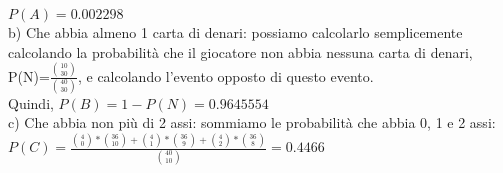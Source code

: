 \documentclass{article}
\begin{document}
\begin{enumerate}
{$P(A)=0.002298$\\
b) Che abbia almeno 1 carta di denari: possiamo calcolarlo semplicemente calcolando la probabilità che il giocatore non abbia nessuna carta di denari, P(N)=$\frac{{{10}\choose{30}}}{{{40}\choose{30}}}$, e calcolando l'evento opposto di questo evento. \\
Quindi, $P(B) = 1 - P(N) = 0.9645554$\\
c) Che abbia non più di 2 assi: sommiamo le probabilità che abbia 0, 1 e 2 assi:\\
$P(C) = \frac{{{4}\choose{0}}*{{36}\choose{10}}+{{4}\choose{1}}*{{36}\choose{9}}+{{4}\choose{2}}*{{36}\choose{8}}}{{{40}\choose{10}}}=0.4466$
}
\end{enumerate}
\end{document}
